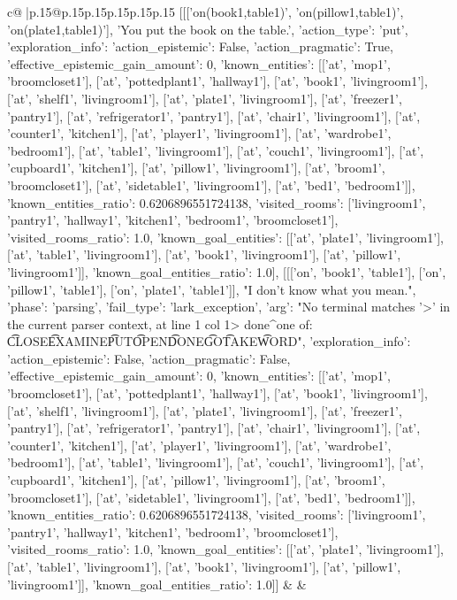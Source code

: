 \documentclass{article}
\begin{document}
{\begin{supertabular}{c@{$\;$}|p{.15\linewidth}@{}p{.15\linewidth}p{.15\linewidth}p{.15\linewidth}p{.15\linewidth}p{.15\linewidth}}
{{{	 [[['on(book1,table1)', 'on(pillow1,table1)', 'on(plate1,table1)'], 'You put the book on the table.', {'action_type': 'put', 'exploration_info': {'action_epistemic': False, 'action_pragmatic': True, 'effective_epistemic_gain_amount': 0, 'known_entities': [['at', 'mop1', 'broomcloset1'], ['at', 'pottedplant1', 'hallway1'], ['at', 'book1', 'livingroom1'], ['at', 'shelf1', 'livingroom1'], ['at', 'plate1', 'livingroom1'], ['at', 'freezer1', 'pantry1'], ['at', 'refrigerator1', 'pantry1'], ['at', 'chair1', 'livingroom1'], ['at', 'counter1', 'kitchen1'], ['at', 'player1', 'livingroom1'], ['at', 'wardrobe1', 'bedroom1'], ['at', 'table1', 'livingroom1'], ['at', 'couch1', 'livingroom1'], ['at', 'cupboard1', 'kitchen1'], ['at', 'pillow1', 'livingroom1'], ['at', 'broom1', 'broomcloset1'], ['at', 'sidetable1', 'livingroom1'], ['at', 'bed1', 'bedroom1']], 'known_entities_ratio': 0.6206896551724138, 'visited_rooms': ['livingroom1', 'pantry1', 'hallway1', 'kitchen1', 'bedroom1', 'broomcloset1'], 'visited_rooms_ratio': 1.0, 'known_goal_entities': [['at', 'plate1', 'livingroom1'], ['at', 'table1', 'livingroom1'], ['at', 'book1', 'livingroom1'], ['at', 'pillow1', 'livingroom1']], 'known_goal_entities_ratio': 1.0}}], [[['on', 'book1', 'table1'], ['on', 'pillow1', 'table1'], ['on', 'plate1', 'table1']], "I don't know what you mean.", {'phase': 'parsing', 'fail_type': 'lark_exception', 'arg': "No terminal matches '>' in the current parser context, at line 1 col 1\n\n> done\n^\nExpected one of: \n\t* CLOSE\n\t* EXAMINE\n\t* PUT\n\t* OPEN\n\t* DONE\n\t* GO\n\t* TAKE\n\t* WORD\n", 'exploration_info': {'action_epistemic': False, 'action_pragmatic': False, 'effective_epistemic_gain_amount': 0, 'known_entities': [['at', 'mop1', 'broomcloset1'], ['at', 'pottedplant1', 'hallway1'], ['at', 'book1', 'livingroom1'], ['at', 'shelf1', 'livingroom1'], ['at', 'plate1', 'livingroom1'], ['at', 'freezer1', 'pantry1'], ['at', 'refrigerator1', 'pantry1'], ['at', 'chair1', 'livingroom1'], ['at', 'counter1', 'kitchen1'], ['at', 'player1', 'livingroom1'], ['at', 'wardrobe1', 'bedroom1'], ['at', 'table1', 'livingroom1'], ['at', 'couch1', 'livingroom1'], ['at', 'cupboard1', 'kitchen1'], ['at', 'pillow1', 'livingroom1'], ['at', 'broom1', 'broomcloset1'], ['at', 'sidetable1', 'livingroom1'], ['at', 'bed1', 'bedroom1']], 'known_entities_ratio': 0.6206896551724138, 'visited_rooms': ['livingroom1', 'pantry1', 'hallway1', 'kitchen1', 'bedroom1', 'broomcloset1'], 'visited_rooms_ratio': 1.0, 'known_goal_entities': [['at', 'plate1', 'livingroom1'], ['at', 'table1', 'livingroom1'], ['at', 'book1', 'livingroom1'], ['at', 'pillow1', 'livingroom1']], 'known_goal_entities_ratio': 1.0}}]] 
	  } 
	   } 
	   } 
	 & & \\ 
 


\end{supertabular}}
\end{document}
